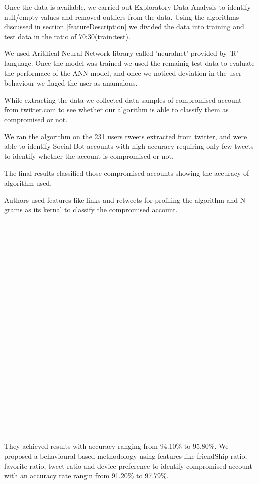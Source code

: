 \documentclass[conference]{IEEEtran}
\begin{document}
	  Once the data is available, we carried out Exploratory Data Analysis to identify null/empty values and removed outliers from the data. 
	  Using the algorithms discussed in section \ref{featureDescription} we divided the data into training and test data in the ratio of 70:30(train:test).

	  We used Aritifical Neural Network library called 'neuralnet' provided by 'R' language. 
	  Once the model was trained we used the remainig test data to evaluate the performace of the ANN model, 
	  and once we noticed deviation in the user behaviour we flaged the user as anamalous.
	
	  While extracting the data we collected data samples of compromised account from twitter.com to see 
	  whether our algorithm is able to classify them as compromised or not. 
	  
	  We ran the algorithm on the 231 users tweets extracted from twitter, and were able to identify Social Bot accounts 
	  with high accuracy requiring only few tweets to identify whether the account is compromised or not.
	 
	  The final results classified those compromised accounts showing the accuracy of algorithm used.
	  
	  Authors\cite{12} used features like links and retweets for profiling the algorithm and N-grams as its kernal to classify the compromised account.\\\\\\\\\\\\\\\\\\\\\\\\\\\\\\\\\\\\\\\\\\\\\\\\
	   They achieved results with accuracy ranging  from 94.10\% to 95.80\%. We proposed a behavioural based methodology using features like friendShip ratio, favorite
	  ratio, tweet ratio and device preference to identify compromised account with an accuracy rate rangin from 91.20\% to 97.79\%.
 
\end{document}
